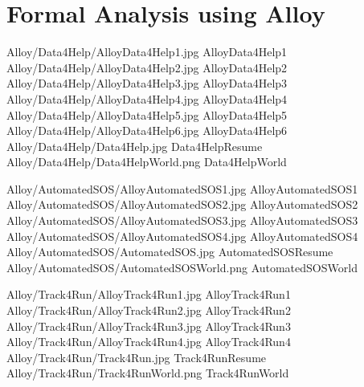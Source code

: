 \documentclass[../rasd.tex]{subfiles}
\begin{document}
\chapter{Formal Analysis using Alloy}
\thispagestyle{fancy}
	\image {12cm} {Alloy/Data4Help/AlloyData4Help1.jpg} {} {AlloyData4Help1}
	\image {20cm} {Alloy/Data4Help/AlloyData4Help2.jpg} {} {AlloyData4Help2}
	\image {20cm} {Alloy/Data4Help/AlloyData4Help3.jpg} {} {AlloyData4Help3}
	\image {20cm} {Alloy/Data4Help/AlloyData4Help4.jpg} {} {AlloyData4Help4}
	\image {20cm} {Alloy/Data4Help/AlloyData4Help5.jpg} {} {AlloyData4Help5}
	\image {20cm} {Alloy/Data4Help/AlloyData4Help6.jpg} {} {AlloyData4Help6}
	\image {20cm} {Alloy/Data4Help/Data4Help.jpg} {} {Data4HelpResume}
	\image {20cm} {Alloy/Data4Help/Data4HelpWorld.png} {} {Data4HelpWorld}

	\image {20cm} {Alloy/AutomatedSOS/AlloyAutomatedSOS1.jpg} {} {AlloyAutomatedSOS1}
	\image {20cm} {Alloy/AutomatedSOS/AlloyAutomatedSOS2.jpg} {} {AlloyAutomatedSOS2}
	\image {20cm} {Alloy/AutomatedSOS/AlloyAutomatedSOS3.jpg} {} {AlloyAutomatedSOS3}
	\image {20cm} {Alloy/AutomatedSOS/AlloyAutomatedSOS4.jpg} {} {AlloyAutomatedSOS4}
	\image {20cm} {Alloy/AutomatedSOS/AutomatedSOS.jpg} {} {AutomatedSOSResume}
	\image {20cm} {Alloy/AutomatedSOS/AutomatedSOSWorld.png} {} {AutomatedSOSWorld}

	\image {20cm} {Alloy/Track4Run/AlloyTrack4Run1.jpg} {} {AlloyTrack4Run1}
	\image {20cm} {Alloy/Track4Run/AlloyTrack4Run2.jpg} {} {AlloyTrack4Run2}
	\image {20cm} {Alloy/Track4Run/AlloyTrack4Run3.jpg} {} {AlloyTrack4Run3}
	\image {20cm} {Alloy/Track4Run/AlloyTrack4Run4.jpg} {} {AlloyTrack4Run4}
	\image {20cm} {Alloy/Track4Run/Track4Run.jpg} {} {Track4RunResume}
	\image {20cm} {Alloy/Track4Run/Track4RunWorld.png} {} {Track4RunWorld}
\end{document}
